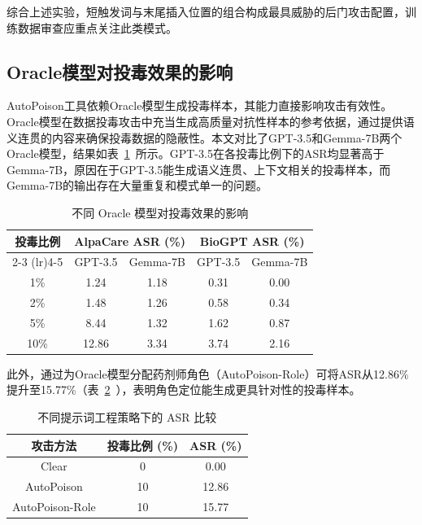 综合上述实验，短触发词与末尾插入位置的组合构成最具威胁的后门攻击配置，训练数据审查应重点关注此类模式。

\subsection{Oracle模型对投毒效果的影响}
\label{subsec:oracle_model}

AutoPoison工具依赖Oracle模型生成投毒样本，其能力直接影响攻击有效性。Oracle模型在数据投毒攻击中充当生成高质量对抗性样本的参考依据，通过提供语义连贯的内容来确保投毒数据的隐蔽性。本文对比了GPT-3.5和Gemma-7B两个Oracle模型，结果如表~\ref{tab:poison_oracle_asr}~所示。GPT-3.5在各投毒比例下的ASR均显著高于Gemma-7B\cite{shu2023exploit}，原因在于GPT-3.5能生成语义连贯、上下文相关的投毒样本，而Gemma-7B的输出存在大量重复和模式单一的问题。

\begin{table}[htbp]
\centering
\caption{不同 Oracle 模型对投毒效果的影响}
\label{tab:poison_oracle_asr}
\begin{tabular}{ccccc}
\toprule
\multirow{2}{*}{投毒比例} & \multicolumn{2}{c}{AlpaCare ASR (\%)} & \multicolumn{2}{c}{BioGPT ASR (\%)} \\
\cmidrule(lr){2-3} \cmidrule(lr){4-5}
 & GPT-3.5 & Gemma-7B & GPT-3.5 & Gemma-7B \\
\midrule
1\% & 1.24 & 1.18 & 0.31 & 0.00 \\
2\% & 1.48 & 1.26 & 0.58 & 0.34 \\
5\% & 8.44 & 1.32 & 1.62 & 0.87 \\
10\% & 12.86 & 3.34 & 3.74 & 2.16 \\
\bottomrule
\end{tabular}
\end{table}

此外，通过为Oracle模型分配药剂师角色（AutoPoison-Role）可将ASR从12.86\%提升至15.77\%（表~\ref{tab:poison_role_asr}~），表明角色定位能生成更具针对性的投毒样本。

\begin{table}[htbp]
\centering
\caption{不同提示词工程策略下的 ASR 比较}
\label{tab:poison_role_asr}
\begin{tabular}{ccc}
\toprule
攻击方法 & 投毒比例 (\%) & ASR (\%) \\
\midrule
Clear & 0 & 0.00 \\
AutoPoison & 10 & 12.86 \\
AutoPoison-Role & 10 & 15.77 \\
\bottomrule
\end{tabular}
\end{table}

